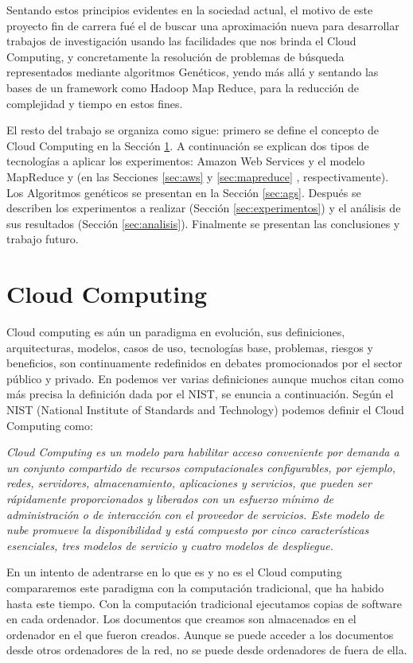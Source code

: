 \documentclass[runningheads]{llncs}
\begin{document}
Sentando estos principios evidentes en la sociedad actual, el motivo de este proyecto fin de carrera fué el de buscar una aproximación nueva para 
desarrollar trabajos de investigación usando las facilidades que nos brinda el Cloud Computing, y concretamente la resolución de 
problemas de búsqueda representados mediante algoritmos Genéticos, yendo más allá y sentando las bases de un framework como 
Hadoop Map Reduce, para la reducción de complejidad y tiempo en estos fines.

El resto del trabajo se organiza como sigue: primero se define el concepto de Cloud Computing en la Sección \ref{sec:cloud}. A continuación se explican dos tipos de tecnologías a aplicar los experimentos: Amazon Web Services y el modelo MapReduce y  (en las Secciones \ref{sec:aws} y \ref{sec:mapreduce} , respectivamente). Los Algoritmos genéticos se presentan en la Sección \ref{sec:ags}. Después se describen los experimentos a realizar (Sección \ref{sec:experimentos}) y el análisis de sus resultados (Sección \ref{sec:analisis}). Finalmente se presentan las conclusiones y trabajo futuro.



\section{Cloud Computing}
\label{sec:cloud}
Cloud computing es aún un paradigma en evolución, sus definiciones, arquitecturas, modelos, casos de uso, tecnologías base, problemas, 
riesgos y beneficios, son continuamente redefinidos en debates promocionados por el sector público y privado. En\cite{Bible2011} 
podemos ver varias  definiciones aunque muchos citan como más precisa la definición dada por el NIST, se enuncia a continuación.
Según el NIST (National Institute of Standards and Technology) podemos definir el Cloud Computing como: 

\textit{Cloud Computing es un modelo para habilitar acceso conveniente por demanda a un conjunto compartido de recursos computacionales 
configurables, por ejemplo, redes, servidores, almacenamiento, aplicaciones y servicios, que pueden ser rápidamente proporcionados y 
liberados con un esfuerzo mínimo de administración o de interacción con el proveedor de servicios. Este modelo de nube promueve la 
disponibilidad y está compuesto por cinco características esenciales, tres modelos de servicio y cuatro modelos de despliegue. }



En un intento de adentrarse en lo que es y no es el Cloud computing compararemos este paradigma con la computación tradicional, 
que ha habido hasta este tiempo. Con la computación tradicional ejecutamos copias de software en cada ordenador. 
Los documentos que creamos  son almacenados en el ordenador en el que fueron creados. Aunque se puede acceder a los documentos desde 
otros ordenadores de la red, no se puede desde ordenadores de fuera de ella. 
\end{document}
